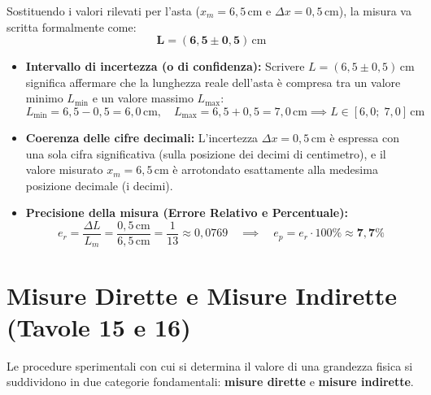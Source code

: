 \documentclass[11pt,a4paper,oneside]{report}
\begin{document}
\begin{metodo}
Sostituendo i valori rilevati per l'asta ($x_m = 6{,}5\,\mathrm{cm}$ e $\Delta x = 0{,}5\,\mathrm{cm}$), la misura va scritta formalmente come:
\begin{equation}
    \mathbf{\boxed{L = (6{,}5 \pm 0{,}5)\,\mathrm{cm}}}
\end{equation}
\begin{itemize}[leftmargin=2em]
    \item \textbf{Intervallo di incertezza (o di confidenza):} Scrivere $L = (6{,}5 \pm 0{,}5)\,\mathrm{cm}$ significa affermare che la lunghezza reale dell'asta \`e compresa tra un valore minimo $L_{\min}$ e un valore massimo $L_{\max}$:
    \[
        L_{\min} = 6{,}5 - 0{,}5 = 6{,}0\,\mathrm{cm}, \quad L_{\max} = 6{,}5 + 0{,}5 = 7{,}0\,\mathrm{cm} \implies L \in [6{,}0;\; 7{,}0]\,\mathrm{cm}
    \]
    \item \textbf{Coerenza delle cifre decimali:} L'incertezza $\Delta x = 0{,}5\,\mathrm{cm}$ \`e espressa con una sola cifra significativa (sulla posizione dei decimi di centimetro), e il valore misurato $x_m = 6{,}5\,\mathrm{cm}$ \`e arrotondato esattamente alla medesima posizione decimale (i decimi).
    \item \textbf{Precisione della misura (Errore Relativo e Percentuale):}
    \[
        e_r = \frac{\Delta L}{L_m} = \frac{0{,}5\,\mathrm{cm}}{6{,}5\,\mathrm{cm}} = \frac{1}{13} \approx 0{,}0769 \quad \implies \quad e_p = e_r \cdot 100\% \approx \mathbf{7{,}7\%}
    \]
\end{itemize}
\end{metodo}

\section{Misure Dirette e Misure Indirette (Tavole 15 e 16)}

Le procedure sperimentali con cui si determina il valore di una grandezza fisica si suddividono in due categorie fondamentali: \textbf{misure dirette} e \textbf{misure indirette}.
\end{document}
